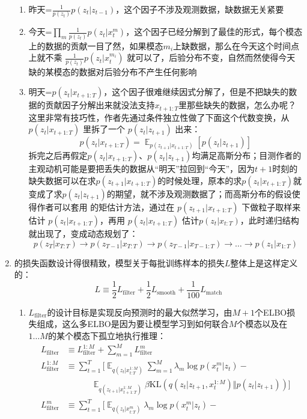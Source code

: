 \documentclass[11pt]{article}
\begin{document}
\begin{enumerate}
\begin{enumerate}
\item 昨天=$\frac{1}{p(z_t)}p(z_t|z_{t-1})$，这个因子不涉及观测数据，缺数据无关紧要
\item 今天=$\prod_m \frac{1}{p(z_t)}p(z_t|x_t^m)$，这个因子已经分解到了最佳的形式，每个模态上的数据的贡献一目了然，如果模态$m_i$上缺数据，那么在今天这个时间点上就不乘 $\frac{1}{p(z_t)}p(z_t|x_t^{m_i})$ 就可以了，后验分布不变，自然而然使得今天缺的某模态的数据对后验分布不产生任何影响
\item 明天=$p(z_t|x_{t+1:T})$，这个因子很难继续因式分解了，但是不把缺失的数据的贡献因子分解出来就没法支持$x_{t+1:T}$里那些缺失的数据，怎么办呢？这里非常有技巧性，作者先通过条件独立性做了下面这个代数变换，从 $p(z_t|x_{t+1:T})$ 里拆了一个 $p(z_t|z_{t+1})$ 出来：\[
p(z_t|x_{t+1:T})=\mathop{\mathbb{E}}_{p(z_{t+1}|x_{t+1:T})}[p(z_t|z_{t+1})]
\]拆完之后再假定$p(z_t|x_{t+1:T})$、$p(z_t|z_{t+1})$均满足高斯分布；目测作者的主观动机可能是要把丢失的数据从“明天”拉回到“今天”，因为$t+1$时刻的缺失数据可以在求$p(z_{t+1}|x_{t+1:T})$的时候处理，原本的求$p(z_t|x_{t+1:T})$就变成了求$p(z_t|z_{t+1})$的期望，就不涉及观测数据了；而高斯分布的假设使得作者可以套用 \cite{5991332} 的矩估计方法，通过在 $p(z_{t+1}|x_{t+1:T})$ 下做粒子取样来估计 $p(z_t|x_{t+1:T})$，再用 $p(z_t|x_{t+1:T})$ 估计$p(z_t|x_{t:T})$，此时递归结构就出现了，变成动态规划了：\[
p(z_{T}|x_{T:T})\to p(z_{T-1}|x_{T:T})\to p(z_{T-1}|x_{T-1:T})\to\dots\to p(z_1|x_{1:T})
\]
\end{enumerate}
\item \cite{Tan2019FactorizedII} 的损失函数设计得很精致，模型关于每批训练样本的损失$L$整体上是这样定义的：\[
L\equiv\frac{1}{2}L_\text{filter}+\frac{1}{2}L_\text{smooth}+\frac{1}{100}L_\text{match}
\]
\begin{enumerate}
\item $L_\text{filter}$的设计目标是实现反向预测时的最大似然学习，由$M+1$个ELBO损失组成，这么多ELBO是因为要让模型学习到如何联合$M$个模态以及在$1\dots M$的某个模态下孤立地执行推理：\[
\begin{split}
L_\text{filter}&\equiv L_\text{filter}^{1:M}+\sum_{m=1}^M L_\text{filter}^m\\
L_\text{filter}^{1:M}&\equiv\sum_{t=1}^T[\mathop{\mathbb{E}}_{q(z_t|x_{t:T}^{1:M})}\sum_{m=1}^M\lambda_m\log p(x_t^m|z_t)-\\
&\quad\qquad\mathop{\mathbb{E}}_{q(z_{t+1}|x_{t+1:T}^{1:M})}\beta\text{KL}\left(q(z_t|z_{t+1},x_t^{1:M})\Vert p(z_t|z_{t+1})\right)]\\
L_\text{filter}^m&\equiv\sum_{t=1}^T[\mathop{\mathbb{E}}_{q(z_t|x_{t:T}^m)}\lambda_m\log p(x_t^m|z_t)-\\

\end{split}\]
\end{enumerate}
\end{enumerate}
\end{document}
